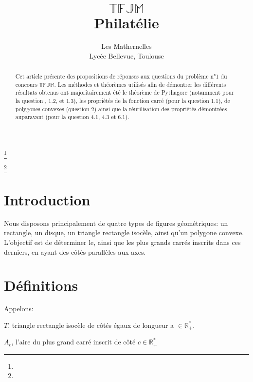 \documentclass[]{amsart}
\theoremstyle{definition}
\theoremstyle{remark}
\numberwithin{equation}{section}
\begin{document}
\title{$\mathbb{TFJM}$ \\ Philatélie}

\curraddr{}
\thanks{}
\author{Les Mathernelles \\ Lycée Bellevue, Toulouse}
\address{}
\curraddr{}
\email{}
\thanks{}

\dedicatory{}

\maketitle

\begin{abstract}
Cet article présente des propositions de réponses aux questions du problème n°1 du concours $\mathbb{TFJM}$. Les méthodes et théorèmes utilisés afin de démontrer les différents résultats obtenus ont majoritairement été le théorème de Pythagore (notamment pour la question , 1.2, et 1.3), les propriétés de la fonction carré (pour la question 1.1), de polygones convexes (question 2) ainsi que la réutilisation des propriétés démontrées auparavant (pour la question 4.1, 4.3 et 6.1).
    
\end{abstract}

\section*{Introduction}
Nous disposons principalement de quatre types de figures géométriques: un rectangle, un disque, un triangle rectangle isocèle, ainsi qu'un polygone convexe. L'objectif est de déterminer le, ainsi que les plus grands carrés inscrits dans ces derniers, en ayant des côtés parallèles aux axes.

\tableofcontents

\newpage

\section*{Définitions}
\begin{center}
\underline{Appelons:}
\end{center}

$T$, \hspace{2.1cm}triangle rectangle isocèle de côtés égaux de longueur a $\in \mathbb{R_{+}^{\ast}}$.

$A_c$, \hspace{2.0cm}l'aire du plus grand carré inscrit de côté $c \in \mathbb{R_{+}^{\ast}}$
\end{document}
